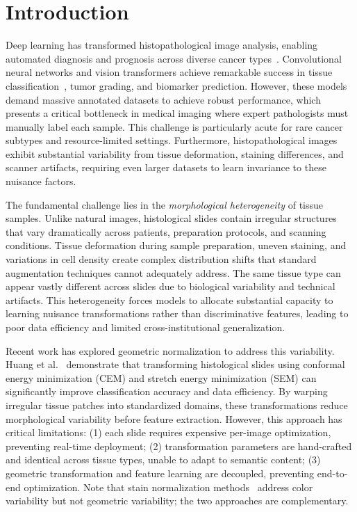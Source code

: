 \documentclass[10pt,journal,compsoc]{IEEEtran}
\begin{document}
\section{Introduction}

Deep learning has transformed histopathological image analysis, enabling automated diagnosis and prognosis across diverse cancer types~\cite{huang2024surface,kuntz2021gastrointestinal,chaunzwa2021deep}. Convolutional neural networks and vision transformers achieve remarkable success in tissue classification~\cite{hirra2021breast,wetstein2022deep}, tumor grading, and biomarker prediction. However, these models demand massive annotated datasets to achieve robust performance, which presents a critical bottleneck in medical imaging where expert pathologists must manually label each sample. This challenge is particularly acute for rare cancer subtypes and resource-limited settings. Furthermore, histopathological images exhibit substantial variability from tissue deformation, staining differences, and scanner artifacts, requiring even larger datasets to learn invariance to these nuisance factors.

The fundamental challenge lies in the \textit{morphological heterogeneity} of tissue samples. Unlike natural images, histological slides contain irregular structures that vary dramatically across patients, preparation protocols, and scanning conditions. Tissue deformation during sample preparation, uneven staining, and variations in cell density create complex distribution shifts that standard augmentation techniques cannot adequately address. The same tissue type can appear vastly different across slides due to biological variability and technical artifacts. This heterogeneity forces models to allocate substantial capacity to learning nuisance transformations rather than discriminative features, leading to poor data efficiency and limited cross-institutional generalization.

Recent work has explored geometric normalization to address this variability. Huang et al.~\cite{huang2024surface} demonstrate that transforming histological slides using conformal energy minimization (CEM) and stretch energy minimization (SEM) can significantly improve classification accuracy and data efficiency. By warping irregular tissue patches into standardized domains, these transformations reduce morphological variability before feature extraction. However, this approach has critical limitations: (1) each slide requires expensive per-image optimization, preventing real-time deployment; (2) transformation parameters are hand-crafted and identical across tissue types, unable to adapt to semantic content; (3) geometric transformation and feature learning are decoupled, preventing end-to-end optimization. Note that stain normalization methods~\cite{macenko2009method,shaban2019staingan} address color variability but not geometric variability; the two approaches are complementary.
\end{document}
